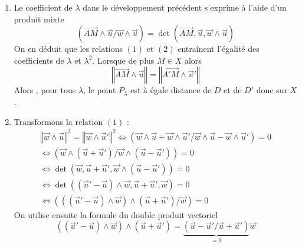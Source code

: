 \begin{enumerate}
\begin{enumerate}
\item Le coefficient de $\lambda$ dans le développement précédent s'exprime à l'aide d'un produit mixte
\begin{displaymath}
 \left(\overrightarrow{AM}\wedge \overrightarrow u / \overrightarrow{w}\wedge \overrightarrow u\right)
=
\det(\overrightarrow{AM}, \overrightarrow u , \overrightarrow{w}\wedge \overrightarrow u)
\end{displaymath}
On en déduit que les relations $(1)$ et $(2)$ entraînent l'égalité des coefficients de $\lambda$ et $\lambda^2$. Lorsque de plus $M\in X$ alors 
\begin{displaymath}
 \left\Vert \overrightarrow{AM}\wedge \overrightarrow u\right\Vert =
\left\Vert \overrightarrow{A'M}\wedge \overrightarrow u'\right\Vert
\end{displaymath}
Alors , pour tous $\lambda$, le point $P_\lambda$ est à égale distance de $D$ et de $D'$ donc sur $X$.
\item Transformons la relation $(1)$ :
\begin{multline*}
 \left\Vert \overrightarrow{w}\wedge \overrightarrow u\right\Vert ^2
=
\left\Vert \overrightarrow{w}\wedge \overrightarrow u'\right\Vert ^2
\Leftrightarrow
\left( 
\overrightarrow{w}\wedge \overrightarrow u + \overrightarrow{w}\wedge \overrightarrow u'
/
\overrightarrow{w}\wedge \overrightarrow u - \overrightarrow{w}\wedge \overrightarrow u'
\right) =0\\
\Leftrightarrow
\left( 
\overrightarrow{w}\wedge (\overrightarrow u + \overrightarrow u') 
/
\overrightarrow{w}\wedge (\overrightarrow u - \overrightarrow u')
\right) =0 \\
\Leftrightarrow
\det(
\overrightarrow w
,
\overrightarrow u + \overrightarrow u'
,
\overrightarrow{w}\wedge (\overrightarrow u - \overrightarrow u')
)=0 \\
\Leftrightarrow
\det(
(\overrightarrow u' - \overrightarrow u)\wedge \overrightarrow{w},
\overrightarrow u + \overrightarrow u' ,
\overrightarrow w
)=0 \\
\Leftrightarrow
\left( 
\left( (\overrightarrow u' - \overrightarrow u)\wedge \overrightarrow w\right) 
\wedge(\overrightarrow u + \overrightarrow u')
/
\overrightarrow w
\right) =0
\end{multline*}
On utilise ensuite la formule du double produit vectoriel
\begin{displaymath}
\left(  (\overrightarrow u' - \overrightarrow u)\wedge \overrightarrow w \right) 
\wedge(\overrightarrow u + \overrightarrow u')
=
\underset{=0}{\underbrace{\left( \overrightarrow u - \overrightarrow u'/\overrightarrow u + \overrightarrow u'\right)}} \overrightarrow w

\end{displaymath}
\end{enumerate}
\end{enumerate}
